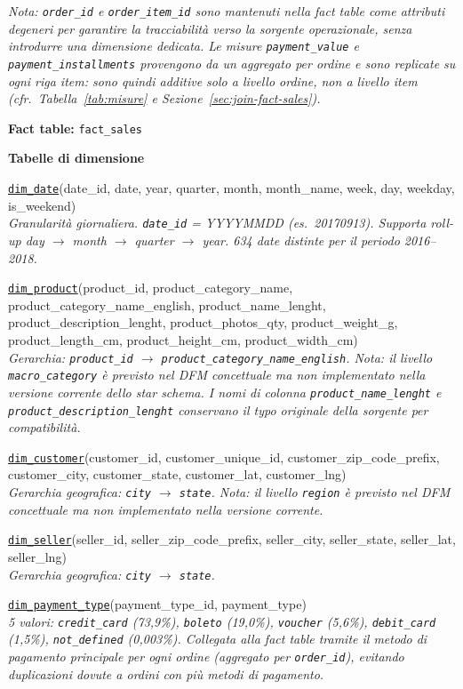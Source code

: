 \documentclass[12pt,a4paper]{article}
\begin{document}
\textit{Nota: \texttt{order\_id} e \texttt{order\_item\_id} sono mantenuti nella fact
table come attributi degeneri per garantire la tracciabilità verso la sorgente
operazionale, senza introdurre una dimensione dedicata. Le misure
\texttt{payment\_value} e \texttt{payment\_installments} provengono da un aggregato
per ordine e sono replicate su ogni riga item: sono quindi additive solo a livello
ordine, non a livello item (cfr.\ Tabella~\ref{tab:misure} e
Sezione~\ref{sec:join-fact-sales}).}

\textbf{Fact table:} \texttt{fact\_sales}

\medskip
\textbf{Tabelle di dimensione}

\underline{\texttt{dim\_date}}(date\_id, date, year, quarter, month, month\_name, week, day, weekday, is\_weekend)\\
\textit{Granularità giornaliera. \texttt{date\_id} = YYYYMMDD (es.\ 20170913).
Supporta roll-up day $\to$ month $\to$ quarter $\to$ year.
634 date distinte per il periodo 2016--2018.}

\medskip
\underline{\texttt{dim\_product}}(product\_id, product\_category\_name,
product\_category\_name\_english, product\_name\_lenght, product\_description\_lenght,
product\_photos\_qty, product\_weight\_g, product\_length\_cm, product\_height\_cm,
product\_width\_cm)\\
\textit{Gerarchia: \texttt{product\_id} $\to$ \texttt{product\_category\_name\_english}.
Nota: il livello \texttt{macro\_category} è previsto nel DFM concettuale ma non
implementato nella versione corrente dello star schema.
I nomi di colonna \texttt{product\_name\_lenght} e \texttt{product\_description\_lenght}
conservano il typo originale della sorgente per compatibilità.}

\medskip
\underline{\texttt{dim\_customer}}(customer\_id, customer\_unique\_id,
customer\_zip\_code\_prefix, customer\_city, customer\_state, customer\_lat, customer\_lng)\\
\textit{Gerarchia geografica: \texttt{city} $\to$ \texttt{state}.
Nota: il livello \texttt{region} è previsto nel DFM concettuale ma non implementato
nella versione corrente.}

\medskip
\underline{\texttt{dim\_seller}}(seller\_id, seller\_zip\_code\_prefix, seller\_city,
seller\_state, seller\_lat, seller\_lng)\\
\textit{Gerarchia geografica: \texttt{city} $\to$ \texttt{state}.}

\medskip
\underline{\texttt{dim\_payment\_type}}(payment\_type\_id, payment\_type)\\
\textit{5 valori: \texttt{credit\_card} (73,9\%), \texttt{boleto} (19,0\%),
\texttt{voucher} (5,6\%), \texttt{debit\_card} (1,5\%), \texttt{not\_defined} (0,003\%).
Collegata alla fact table tramite il metodo di pagamento principale per ogni ordine
(aggregato per \texttt{order\_id}), evitando duplicazioni dovute a ordini con più
metodi di pagamento.}
\end{document}
